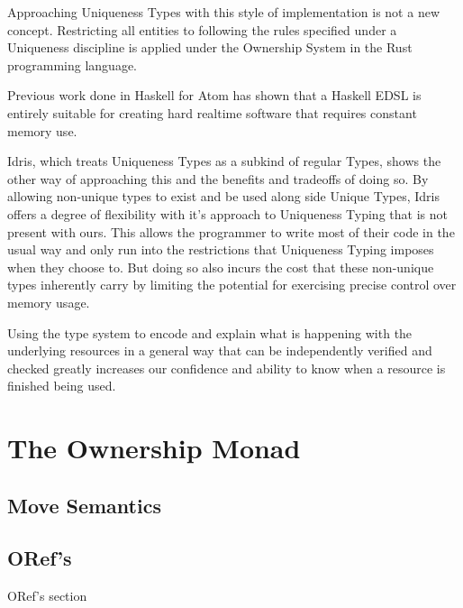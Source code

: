 \documentclass[onehalf,11pt]{beavtex}
\begin{document}
Approaching Uniqueness Types with this style of implementation is not a new
concept.  Restricting all entities to following the rules specified under a
Uniqueness discipline is applied under the Ownership System in the Rust
programming language. 

Previous work done in Haskell for Atom has shown that a Haskell EDSL
is entirely suitable for creating hard realtime software that requires constant
memory use.

Idris, which treats Uniqueness Types as a subkind of regular Types, shows
the other way of approaching this and the benefits and tradeoffs of doing so.
By allowing non-unique types to exist and be used along side Unique Types,
Idris offers a degree of flexibility with it's approach to Uniqueness
Typing that is not present with ours.  
This allows the programmer to write most of their code in the usual way and
only run into the restrictions that Uniqueness Typing imposes when they choose to.
But doing so also incurs the cost that these non-unique types inherently
carry by limiting the potential for exercising precise control over memory
usage.

Using the type system to encode and explain what is happening with the underlying
resources in a general way that can be independently verified and checked greatly
increases our confidence and ability to know when a resource is finished being used.



\chapter{The Ownership Monad}
\section{Move Semantics}
\section{ORef's}
ORef's section






\end{document}
